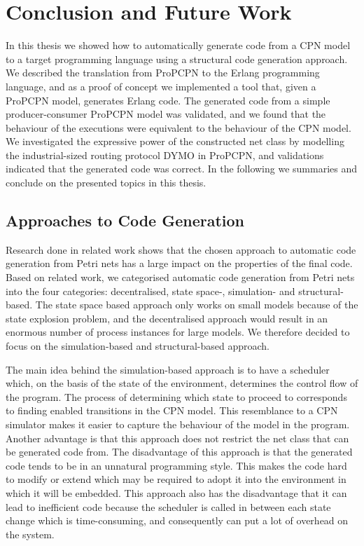 \chapter{Conclusion and Future Work}
\label{chap:confutwo}

In this thesis we showed how to automatically generate code from a CPN model to a target programming language using a structural code generation approach. We described the translation from ProPCPN to the Erlang programming language, and as a proof of concept we implemented a tool that, given a ProPCPN model, generates Erlang code. The generated code from a simple producer-consumer ProPCPN model was validated, and we found that the behaviour of the executions were equivalent to the behaviour of the CPN model. We investigated the expressive power of the constructed net class by modelling the industrial-sized routing protocol DYMO in ProPCPN, and validations indicated that the generated code was correct. In the following we summaries and conclude on the presented topics in this thesis.

\section{Approaches to Code Generation}
Research done in related work shows that the chosen approach to automatic code generation from Petri nets has a large impact on the properties of the final code. Based on related work, we categorised automatic code generation from Petri nets into the four categories: decentralised, state space-, simulation- and structural-based. The state space based approach only works on small models because of the state explosion problem, and the decentralised approach would result in an enormous number of process instances for large models. We therefore decided to focus on the simulation-based and structural-based approach.

The main idea behind the simulation-based approach is to have a scheduler which, on the basis of the state of the environment, determines the control flow of the program. The process of determining which state to proceed to corresponds to finding enabled transitions in the CPN model. This resemblance to a CPN simulator makes it easier to capture the behaviour of the model in the program. Another advantage is that this approach does not restrict the net class that can be generated code from. The disadvantage of this approach is that the generated code tends to be in an unnatural programming style. This makes the code hard to modify or extend which may be required to adopt it into the environment in which it will be embedded. This approach also has the disadvantage that it can lead to inefficient code because the scheduler is called in between each state change which is time-consuming, and consequently can put a lot of overhead on the system.


